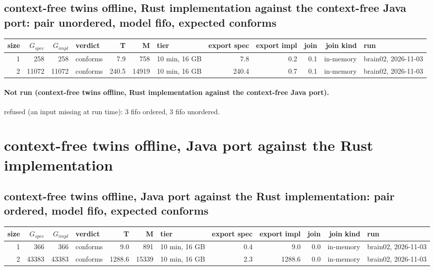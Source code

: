 \documentclass[10pt]{article}
\begin{document}
\subsection*{context-free twins offline, Rust implementation against the context-free Java port: pair \textsf{unordered}, model fifo, expected conforms}
\begin{longtable}{@{}rrrlrrlrrrrl@{}}
\toprule
size & $G_{\mathit{spec}}$ & $G_{\mathit{impl}}$ & verdict & T & M & tier & export spec & export impl & join & join kind & run \\
\midrule
\endhead
\color{red} 1 & 258 & 258 & conforms & 7.9 & 758 & 10 min, 16 GB & 7.8 & 0.2 & 0.1 & in-memory & brain02, 2026-11-03 \\
\color{red} 2 & 11072 & 11072 & conforms & 240.5 & 14919 & 10 min, 16 GB & 240.4 & 0.7 & 0.1 & in-memory & brain02, 2026-11-03 \\
\bottomrule
\end{longtable}
\paragraph{Not run (context-free twins offline, Rust implementation against the context-free Java port).}
refused (an input missing at run time): 3 fifo ordered, 3 fifo unordered.\par
\section*{context-free twins offline, Java port against the Rust implementation}
\subsection*{context-free twins offline, Java port against the Rust implementation: pair \textsf{ordered}, model fifo, expected conforms}
\begin{longtable}{@{}rrrlrrlrrrrl@{}}
\toprule
size & $G_{\mathit{spec}}$ & $G_{\mathit{impl}}$ & verdict & T & M & tier & export spec & export impl & join & join kind & run \\
\midrule
\endhead
\color{red} 1 & 366 & 366 & conforms & 9.0 & 891 & 10 min, 16 GB & 0.4 & 9.0 & 0.0 & in-memory & brain02, 2026-11-03 \\
\color{red} 2 & 43383 & 43383 & conforms & 1288.6 & 15339 & 10 min, 16 GB & 2.3 & 1288.6 & 0.0 & in-memory & brain02, 2026-11-03 \\
\bottomrule
\end{longtable}
\end{document}

